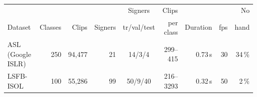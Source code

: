 \begin{tabular}{lrrrcrrrr}
\toprule
 & & & & Signers & Clips & & & No \\
Dataset & Classes & Clips & Signers & tr/val/test & per class & Duration & fps & hand \\
\midrule
ASL (Google ISLR) & 250 & 94,477 & 21 & 14/3/4 & 299--415 & 0.73\,s & 30 & 34\,\% \\
LSFB-ISOL & 100 & 55,286 & 99 & 50/9/40 & 216--3293 & 0.32\,s & 50 & 2\,\% \\
\bottomrule
\end{tabular}
